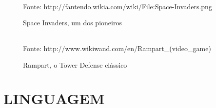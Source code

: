\documentclass[rel_mlp]{iiufrgs}
\newcommand{\fonte}[1]{\\Fonte: {#1}}
\begin{document}
\begin{figure}[htb]
    \centering
    \caption{Space Invaders, um dos pioneiros}
    \label{fig:figura1}
    \fonte{http://fantendo.wikia.com/wiki/File:Space-Invaders.png}
\end{figure}

\begin{figure}[htb]
    \centering
    \caption{Rampart, o Tower Defense clássico}
    \label{fig:figura2}
    \fonte{http://www.wikiwand.com/en/Rampart\_(video\_game)}
\end{figure}


%

\chapter{LINGUAGEM} \label{intro}
\end{document}
